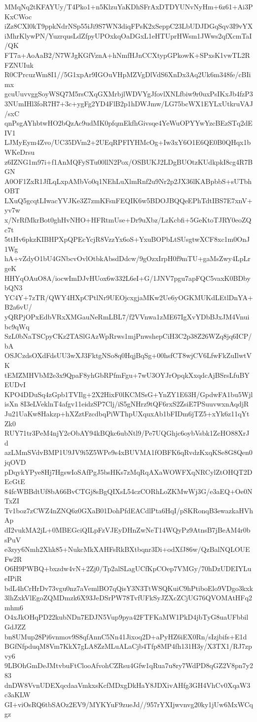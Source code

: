 MMqNq2tKFAYUy/T4Pko1+n5KlzuYaKDhSFrAxDTDYUNvNyHm+6z61+Ai3PKxCWoc
iZz8CXl0kT9ppkNdrNSp55iJi9S7WN3diqFPsK2xSeppC23LbUDJDGqSqv3I9vYX
iMhrKlywPN/YuzrqusLdZfpyUPOxkqOaDGxL1eHTUprHWsm1JWws2qfXcmTaI/QK
FT7a+AoAaB2/N7WJgKGfVznA+hNmfHJnCCXtypGPkowK+SPxsK1vwTL2RFZNUIuk
R0CPrcuzWm8I1//5G1xpAr9IGOuVHpMZVgDlVdS6XnDx3Aq2Uk6m348fe/cBIimx
gcuUuvvggSoyWSQ7M5rsCXqGXMrbjlWDVYgJfovlXNLfbiw9r0uxPsIKxJb4fzP3
3NUmIHl3foR7H7+3c+ygFg2YD4FlB2p1hDWJmw/LG75bcWX1EYLxUtkruVAJ/sxC
qnPsgAYhbtwHO2bQzAc9udMK0pfqmEkfhGivsqe4YeWuOPYYwYzcBEzSTq2dEIV1
LJMyEym4Zvo/UC35DVm2+2UEqRPFIYHMcOg+Iw3xY6O1E6QE0B0QHqx1bWKeDrsu
z6IZNG1m97i+f1AnMQFySTu00llN2Pox/OSBUKJ2LDgBUOtzKUdkpkI8cg4R7BGN
A0OF1ZxR1JfLqLxpAMbVo0q1NEhLuXlmRnf2u9Nr2p2JX36lKABpbbS+sUTbhOBT
LXuQ5gcqtLIwacYVJKe3Z7zmKFsnFEQIK6w5BDOJBQQeEPhTdtIBS7E7xnV+yv7w
x/NrRfMkrBot0ghHvNHO+HFRtmUse+Dr9uXbz/LzKcbfi+5GeKtoTJRY0eoZQc7t
5ttHv6pkzKIBHPXpQPEcYcjR8VzzYx6oS+YxuBOPbLtSUsgtwXCF8xc1m0OnJ1Wg
hA+vZdyO1bU4GNbcvOvlOtbkAbsdDdcw/9gOzxIrpH0f9mTU+gaMsZwy4LpLrgeK
HHYqOAuO8A/iocwImDJvHUox6w332L6eI+G/1JNV7pgu7apFQC5vaxK0BDbybQN3
YC4Y+7zTR/QWY4HXpCPtlNr9UEOjcxgjaMKw2Ue6yOGKMUKdLEtlDnYA+B2a6vU/
yQRPjOPxEdbVRxXMGauNeRmLBL7/f2VVnwa1zME67IgXvYDbBJxJM4Vnuibc9qWq
SzL0bNaTSCpyCKz2TASlGAzWpRrws1mjPnwshepCiH3C2p38Z26WZq8jq6ICP/bA
OSJCzdsOXdFdsUU3wXJ3FktgNSo8q0HqjBqSg+00hsfCT8wjCV6LfwFkZuIlwtVK
tEMZMHVbM2e3x9QpaF8yhGbRPfmFgu+7wU3OYJrOpqkXxqdcAjBSrsLfuBYEUDvI
KPO4DDuSq4zGpb1TVIlg+2X2HixF0lKCMSsG+YnZY1E63H/GpdwFA1bu5WjlisXn
8I3eLVeklnT4afgv11eidzSP7Clj/iS5gNHrz9tQF6rxS2ZsiE7PSuuvwxnAqdjR
Ju21UaKw8Hakzp+hXZztFzcdbqPiWThpUXquxAb1bFIDm6jTZ5+xYk6z11qYtZk0
RUY71tr3PeM4njY2cObAY94kBQkc6ubNtl9/Pe7UQGhjc6oybVsbk1ZcHO88XrJd
azLMmSVdvBMP1U9JV9i5Z5WPe9s4xBUVMA1fOBFK6qRvdzKxqKSe8G8Qen0jqOVD
pDqykYPye8Hj7HgswIoSAfPgJ5bsHKs7zMqRqAXaWOWFXqNRCylZtOHQT2DEcGtE
84fcWBBdtUf8bA66BvCTGj8sBgQIXsL54czCORhLoZKMwWj3G/e3aEQ+Oe0NTxZI
Tv1boz7zCWZ4nZNQ6z0GXaB01DohPfdEACdlPta6HqI/pSKRonqB3ewazkaHVhAp
dI2vukMA2jL+0MBEGciQILpFzVJEyDHnZwNeT14WQyPz9AtnsB7jBeAM4r0bsPuV
e3zyy6Nmh2Xhk85+NukcMkXAHFsRkBXtbqnr3Di+odXfJ86w/QzBalNQLOUEFw2R
O6H9PWBQ+bxzdw4vN+2Zj0/Tp2alSLagUCfKpCOep7VMGy/70hDzUDEIYLueIPiR
bdL4hCrHrDv73vgu0nz7aVemlBO7qQisY3N3TtWSQKuiC9hPtiboElo9VDgo3kxk
3lhZxkVlEgoZQMDmzk6X93JeDSrPW78TvfUFkSyJZXcZCjUG76QVOMAtHFq2mhm6
O4xJkOHqPD22kubNDn7EDJN5Vup9pya42FTFKaMW1PkD4jbTyG8uaUFbbilGdJZZ
bn8UMup28Pi6vnmov9S8qfAnnC5Nn41Jixoq2D+aPyHZ6iEX0Rn/sIzjbifs+E1d
BGfNfpduqM8Vm7KkX7gLA8ZzMLuALaCjb4Tfp8MP4fh131H3y/X3TX1/RJ7zpvy6
9LBOhGmDeJMtvbuFtClooAfvohCZRsu4Gfw1qRua7u8ry7WdPD8qGZ2V8pn7y283
dnDW8VvnUDEXqcdaaVmkxsKcfMDxgDkHaY8JDXivAHfg3GH4VhCv0XqaW3c3aKLW
GI+viOsRQ6tbSAOz2EV9/MYKYuF9zueJd//957rYXIjwvnvg20ky1jUw6MxWCqgz
